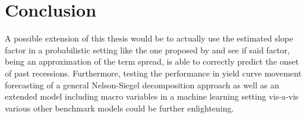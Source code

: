 \section{Conclusion}
\label{sec:conclusion}

A possible extension of this thesis would be to actually use the estimated slope factor in a probabilistic setting like the one proposed by \citet{estrella1991term} and see if said factor, being an approximation of the term spread, is able to correctly predict the onset of past recessions.  Furthermore, testing the performance in yield curve movement forecasting of a general Nelson-Siegel decomposition approach as well as an extended model including macro variables in a machine learning setting vis-a-vis various other benchmark models could be further enlightening. 